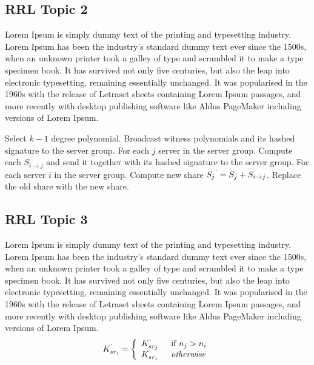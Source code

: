 \subsection{RRL Topic 2}
Lorem Ipsum\cite{DUMMY:1} is simply dummy text of the printing and typesetting industry. Lorem Ipsum has been the industry's standard dummy text ever since the 1500s, when an unknown printer took a galley of type and scrambled it to make a type specimen book. It has survived not only five centuries, but also the leap into electronic typesetting, remaining essentially unchanged. It was popularised in the 1960s with the release of Letraset sheets containing Lorem Ipsum passages, and more recently with desktop publishing software like Aldus PageMaker including versions of Lorem Ipsum. \\

\begin{algorithm}
	\caption{SEKM Rekeying Algorithm - $O(N)$}
	\label{SEKMRekeyingAlgorithm}
	\begin{algorithmic}[1]
		\State Select $k-1$ degree polynomial.
		\State Broadcast witness polynomials and its hashed signature to the server group.
		\State For each $j$ server in the server group.
		\State Compute each $S_{i \rightarrow j}$ and send it together with its hashed signature to the server group.
		\State For each server $i$ in the server group.
		\State Compute new share ${S_j}^\textrm' = S_j + S_{i \rightarrow j}$.
		\State Replace the old share with the new share.
	\end{algorithmic}
\end{algorithm}

\subsection{RRL Topic 3}
Lorem Ipsum\cite{DUMMY:1} is simply dummy text of the printing and typesetting industry. Lorem Ipsum has been the industry's standard dummy text ever since the 1500s, when an unknown printer took a galley of type and scrambled it to make a type specimen book. It has survived not only five centuries, but also the leap into electronic typesetting, remaining essentially unchanged. It was popularised in the 1960s with the release of Letraset sheets containing Lorem Ipsum passages, and more recently with desktop publishing software like Aldus PageMaker including versions of Lorem Ipsum. \\

\begin{align*}
	K_{{sr}_i}^\textrm' = \left\{ 
	\begin{array}{l l}
		K_{{sr}_j}^\textrm' & \enspace \text{if $n_j > n_i$}\\
		K_{{sr}_i}^\textrm' & \enspace \text{\textit{otherwise}}
	\end{array}
	\right.
\end{align*} 

